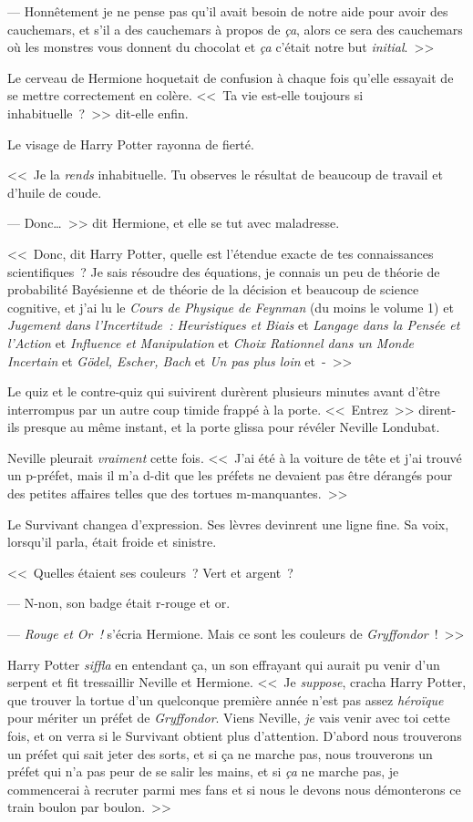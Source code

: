 --- Honnêtement je ne pense pas qu'il avait besoin de notre aide pour avoir des cauchemars, et s'il a des cauchemars à propos de \emph{ça}, alors ce sera des cauchemars où les monstres vous donnent du chocolat et \emph{ça} c'était notre but \emph{initial}.~>>

Le cerveau de Hermione hoquetait de confusion à chaque fois qu'elle essayait de se mettre correctement en colère. <<~Ta vie est-elle toujours si inhabituelle~?~>> dit-elle enfin.

Le visage de Harry Potter rayonna de fierté.

<<~Je la \emph{rends} inhabituelle. Tu observes le résultat de beaucoup de travail et d'huile de coude.

--- Donc…~>> dit Hermione, et elle se tut avec maladresse.

<<~Donc, dit Harry Potter, quelle est l'étendue exacte de tes connaissances scientifiques~? Je sais résoudre des équations, je connais un peu de théorie de probabilité Bayésienne et de théorie de la décision et beaucoup de science cognitive, et j'ai lu le \emph{Cours de Physique de Feynman} (du moins le volume 1) et \emph{Jugement dans l'Incertitude~: Heuristiques et Biais} et \emph{Langage dans la Pensée et l'Action} et \emph{Influence et Manipulation} et \emph{Choix Rationnel dans un Monde Incertain} et \emph{Gödel, Escher, Bach} et \emph{Un pas plus loin} et~-~>>

Le quiz et le contre-quiz qui suivirent durèrent plusieurs minutes avant d'être interrompus par un autre coup timide frappé à la porte. <<~Entrez~>> dirent-ils presque au même instant, et la porte glissa pour révéler Neville Londubat.

Neville pleurait \emph{vraiment} cette fois. <<~J'ai été à la voiture de tête et j'ai trouvé un p-préfet, mais il m'a d-dit que les préfets ne devaient pas être dérangés pour des petites affaires telles que des tortues m-manquantes.~>>

Le Survivant changea d'expression. Ses lèvres devinrent une ligne fine. Sa voix, lorsqu'il parla, était froide et sinistre.

<<~Quelles étaient ses couleurs~? Vert et argent~?

--- N-non, son badge était r-rouge et or.

--- \emph{Rouge et Or~!} s'écria Hermione. Mais ce sont les couleurs de \emph{Gryffondor}~!~>>

Harry Potter \emph{siffla} en entendant ça, un son effrayant qui aurait pu venir d'un serpent et fit tressaillir Neville et Hermione. <<~Je \emph{suppose}, cracha Harry Potter, que trouver la tortue d'un quelconque première année n'est pas assez \emph{héroïque} pour mériter un préfet de \emph{Gryffondor}. Viens Neville, \emph{je} vais venir avec toi cette fois, et on verra si le Survivant obtient plus d'attention. D'abord nous trouverons un préfet qui sait jeter des sorts, et si ça ne marche pas, nous trouverons un préfet qui n'a pas peur de se salir les mains, et si \emph{ça} ne marche pas, je commencerai à recruter parmi mes fans et si nous le devons nous démonterons ce train boulon par boulon.~>>

